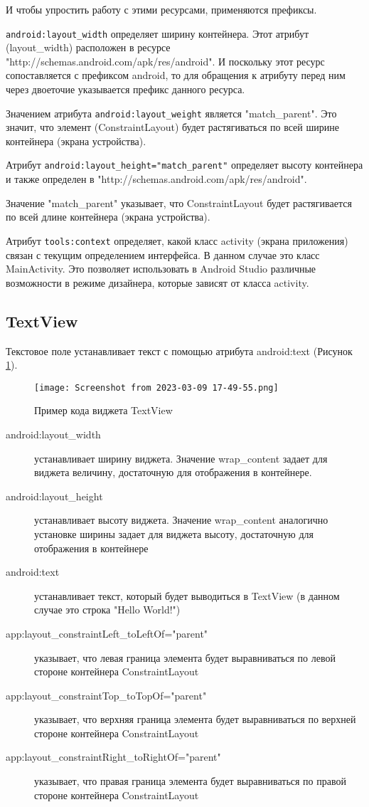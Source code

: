 И чтобы упростить работу с этими ресурсами, применяются префиксы.\par
\texttt{android:layout\_width} определяет ширину контейнера. Этот атрибут
(layout\_width) расположен в ресурсе
"http://schemas.android.com/apk/res/android". И поскольку этот ресурс
сопоставляется с префиксом android, то для обращения к атрибуту перед ним
через двоеточие указывается префикс данного ресурса.\par
Значением атрибута \texttt{android:layout\_weight} является
"match\_parent". Это значит, что элемент (ConstraintLayout)
будет растягиваться по всей ширине контейнера (экрана устройства).\par
Атрибут \texttt{android:layout\_height="match\_parent"} определяет высоту
контейнера и также определен в
"http://schemas.android.com/apk/res/android".\par
Значение "match\_parent" указывает, что ConstraintLayout
будет растягивается по всей длине контейнера (экрана устройства).\par
Атрибут \texttt{tools:context} определяет, какой класс
activity (экрана приложения) связан с текущим определением интерфейса.
В данном случае это класс MainActivity. Это позволяет использовать
в Android Studio различные возможности в режиме дизайнера,
которые зависят от класса activity.

\subsection{TextView}
Текстовое поле устанавливает текст с помощью атрибута android:text
(Рисунок \ref{fig:xml:textview}).

\begin{figure}[h!tp]
	\centering
	\texttt{[image: Screenshot from 2023-03-09 17-49-55.png]}
	\caption{Пример кода виджета TextView}
	\label{fig:xml:textview}
\end{figure}

\begin{description}
	\item[android:layout\_width] устанавливает ширину виджета. Значение
		wrap\_content задает для виджета величину, достаточную для
		отображения в контейнере.
	\item[android:layout\_height] устанавливает высоту виджета. Значение
		wrap\_content аналогично установке ширины задает для виджета высоту,
		достаточную для отображения в контейнере
	\item[android:text] устанавливает текст, который будет выводиться
		в TextView (в данном случае это строка "Hello World!")
	\item[app:layout\_constraintLeft\_toLeftOf="parent"] указывает, что левая
		граница элемента будет выравниваться по левой стороне контейнера
		ConstraintLayout
	\item[app:layout\_constraintTop\_toTopOf="parent"] указывает, что верхняя
		граница элемента будет выравниваться по верхней стороне контейнера
		ConstraintLayout
	\item[app:layout\_constraintRight\_toRightOf="parent"] указывает,
		что правая граница элемента будет выравниваться по правой стороне
		контейнера ConstraintLayout
\end{description}

